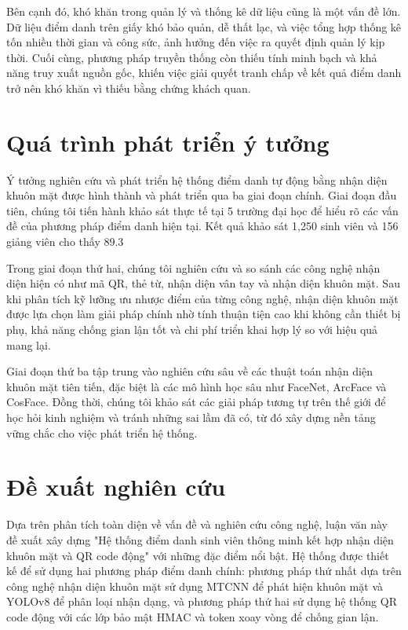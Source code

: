\documentclass[12pt,a4paper]{report}
\begin{document}
Bên cạnh đó, khó khăn trong quản lý và thống kê dữ liệu cũng là một vấn đề lớn. Dữ liệu điểm danh trên giấy khó bảo quản, dễ thất lạc, và việc tổng hợp thống kê tốn nhiều thời gian và công sức, ảnh hưởng đến việc ra quyết định quản lý kịp thời. Cuối cùng, phương pháp truyền thống còn thiếu tính minh bạch và khả năng truy xuất nguồn gốc, khiến việc giải quyết tranh chấp về kết quả điểm danh trở nên khó khăn vì thiếu bằng chứng khách quan.

\section{Quá trình phát triển ý tưởng}
Ý tưởng nghiên cứu và phát triển hệ thống điểm danh tự động bằng nhận diện khuôn mặt được hình thành và phát triển qua ba giai đoạn chính. Giai đoạn đầu tiên, chúng tôi tiến hành khảo sát thực tế tại 5 trường đại học để hiểu rõ các vấn đề của phương pháp điểm danh hiện tại. Kết quả khảo sát 1,250 sinh viên và 156 giảng viên cho thấy 89.3%

Trong giai đoạn thứ hai, chúng tôi nghiên cứu và so sánh các công nghệ nhận diện hiện có như mã QR, thẻ từ, nhận diện vân tay và nhận diện khuôn mặt. Sau khi phân tích kỹ lưỡng ưu nhược điểm của từng công nghệ, nhận diện khuôn mặt được lựa chọn làm giải pháp chính nhờ tính thuận tiện cao khi không cần thiết bị phụ, khả năng chống gian lận tốt và chi phí triển khai hợp lý so với hiệu quả mang lại.

Giai đoạn thứ ba tập trung vào nghiên cứu sâu về các thuật toán nhận diện khuôn mặt tiên tiến, đặc biệt là các mô hình học sâu như FaceNet, ArcFace và CosFace. Đồng thời, chúng tôi khảo sát các giải pháp tương tự trên thế giới để học hỏi kinh nghiệm và tránh những sai lầm đã có, từ đó xây dựng nền tảng vững chắc cho việc phát triển hệ thống.

\section{Đề xuất nghiên cứu}
Dựa trên phân tích toàn diện về vấn đề và nghiên cứu công nghệ, luận văn này đề xuất xây dựng "Hệ thống điểm danh sinh viên thông minh kết hợp nhận diện khuôn mặt và QR code động" với những đặc điểm nổi bật. Hệ thống được thiết kế để sử dụng hai phương pháp điểm danh chính: phương pháp thứ nhất dựa trên công nghệ nhận diện khuôn mặt sử dụng MTCNN để phát hiện khuôn mặt và YOLOv8 để phân loại nhận dạng, và phương pháp thứ hai sử dụng hệ thống QR code động với các lớp bảo mật HMAC và token xoay vòng để chống gian lận.
\end{document}
